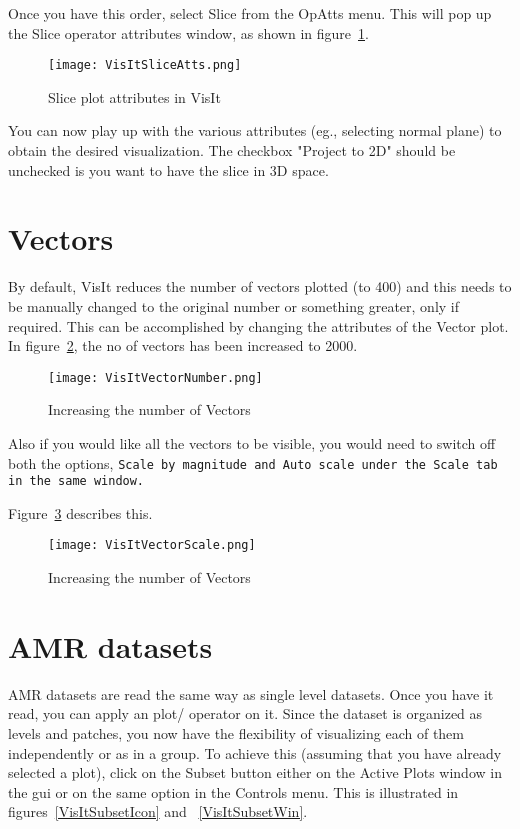 Once you have this order, select Slice from the OpAtts menu. This will pop up the Slice operator attributes window, as shown in figure~\ref{VisItSliceAtts}.

\begin{figure}
  \center
  \texttt{[image: VisItSliceAtts.png]}
  \caption{Slice plot attributes in VisIt}
  \label{VisItSliceAtts}
\end{figure}

You can now play up with the various attributes (eg., selecting normal plane) to obtain the desired visualization. The checkbox "Project to 2D" should be unchecked is you want to have the slice in 3D space.

\section{Vectors}

By default, VisIt reduces the number of vectors plotted (to 400) and this needs to be manually changed to the original number or something greater, only if required.
This can be accomplished by changing the attributes of the Vector plot. In figure~\ref{VisItVectorNumber}, the no of vectors has been increased to 2000.

\begin{figure}
  \center
  \texttt{[image: VisItVectorNumber.png]}
  \caption{Increasing the number of Vectors}
  \label{VisItVectorNumber}
\end{figure}

Also if you would like all the vectors to be visible, you would need to switch off both the options,
\tt Scale by magnitude
\normalfont and
\tt Auto scale
\normalfont under the Scale tab in the same window.

Figure~\ref{VisItVectorScale} describes this.

\begin{figure}
  \center
  \texttt{[image: VisItVectorScale.png]}
  \caption{Increasing the number of Vectors}
  \label{VisItVectorScale}
\end{figure}

\section{AMR datasets}

AMR datasets are read the same way as single level datasets. Once you have it read, you can apply an plot/ operator on it. Since the dataset is organized as levels and patches, you now have the flexibility of visualizing each of them independently or as in a group. To achieve this (assuming that you have already selected a plot), click on the Subset button either on the Active Plots window in the gui or on the same option in the Controls menu. This is illustrated in figures~\ref{VisItSubsetIcon} and ~\ref{VisItSubsetWin}.

